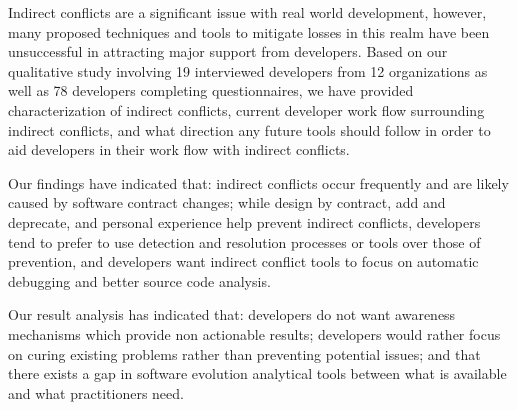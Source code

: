 \documentclass[conference]{IEEEtran}
\begin{document}
Indirect conflicts are a significant issue with real world development, however, many proposed techniques and tools to mitigate
losses in this realm have been unsuccessful in attracting major support from developers. Based on our qualitative study involving
19 interviewed developers from 12 organizations as well as 78 developers completing questionnaires, we have provided characterization of indirect conflicts,
current developer work flow surrounding indirect conflicts, and what direction any future tools should follow in order to aid developers
in their work flow with indirect conflicts.

Our findings have indicated that:
indirect conflicts occur frequently and are likely caused by software contract changes;
while design by contract, add and deprecate, and personal experience help prevent indirect conflicts,
developers tend to prefer to use detection and resolution processes or tools
over those of prevention, and developers want indirect conflict tools to focus on automatic debugging and better source code analysis.

Our result analysis has indicated that: developers do not want awareness mechanisms which provide non actionable results; developers
would rather focus on curing existing problems rather than preventing potential issues;
and that there exists a gap in software evolution analytical tools between what is available and what practitioners need.




\end{document}
